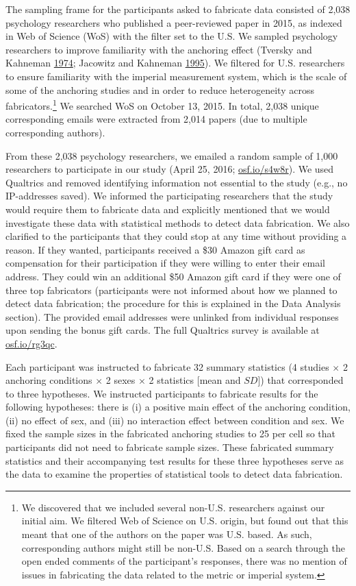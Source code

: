 \documentclass[a5paper]{book}
\let\rmarkdownfootnote\footnote%
\def\footnote{\protect\rmarkdownfootnote}
\begin{document}
The sampling frame for the participants asked to fabricate data
consisted of 2,038 psychology researchers who published a peer-reviewed
paper in 2015, as indexed in Web of Science (WoS) with the filter set to
the U.S. We sampled psychology researchers to improve familiarity with
the anchoring effect (Tversky and Kahneman
\protect\hyperlink{ref-doi:10.1126ux2fscience.185.4157.1124}{1974};
Jacowitz and Kahneman
\protect\hyperlink{ref-doi:10.1037ux2fe722982011-058}{1995}). We
filtered for U.S. researchers to ensure familiarity with the imperial
measurement system, which is the scale of some of the anchoring studies
and in order to reduce heterogeneity across fabricators.\footnote{We
  discovered that we included several non-U.S. researchers against our
  initial aim. We filtered Web of Science on U.S. origin, but found out
  that this meant that one of the authors on the paper was U.S. based.
  As such, corresponding authors might still be non-U.S. Based on a
  search through the open ended comments of the participant's responses,
  there was no mention of issues in fabricating the data related to the
  metric or imperial system.} We searched WoS on October 13, 2015. In
total, 2,038 unique corresponding emails were extracted from 2,014
papers (due to multiple corresponding authors).

From these 2,038 psychology researchers, we emailed a random sample of
1,000 researchers to participate in our study (April 25, 2016;
\href{https://osf.io/s4w8r}{osf.io/s4w8r}). We used Qualtrics and
removed identifying information not essential to the study (e.g., no
IP-addresses saved). We informed the participating researchers that the
study would require them to fabricate data and explicitly mentioned that
we would investigate these data with statistical methods to detect data
fabrication. We also clarified to the participants that they could stop
at any time without providing a reason. If they wanted, participants
received a \$30 Amazon gift card as compensation for their participation
if they were willing to enter their email address. They could win an
additional \$50 Amazon gift card if they were one of three top
fabricators (participants were not informed about how we planned to
detect data fabrication; the procedure for this is explained in the Data
Analysis section). The provided email addresses were unlinked from
individual responses upon sending the bonus gift cards. The full
Qualtrics survey is available at
\href{https://osf.io/rg3qc}{osf.io/rg3qc}.

Each participant was instructed to fabricate 32 summary statistics (4
studies \(\times\) 2 anchoring conditions \(\times\) 2 sexes \(\times\)
2 statistics {[}mean and \(SD\){]}) that corresponded to three
hypotheses. We instructed participants to fabricate results for the
following hypotheses: there is (i) a positive main effect of the
anchoring condition, (ii) no effect of sex, and (iii) no interaction
effect between condition and sex. We fixed the sample sizes in the
fabricated anchoring studies to 25 per cell so that participants did not
need to fabricate sample sizes. These fabricated summary statistics and
their accompanying test results for these three hypotheses serve as the
data to examine the properties of statistical tools to detect data
fabrication.
\end{document}
